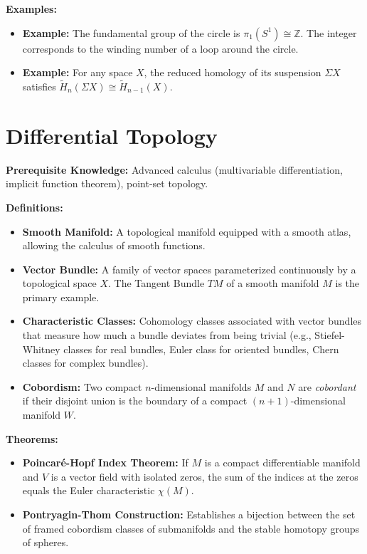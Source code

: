 \textbf{Examples:}
\begin{itemize}
    \item \textbf{Example:} The fundamental group of the circle is $\pi_1(S^1) \cong \mathbb{Z}$. The integer corresponds to the winding number of a loop around the circle.
    \item \textbf{Example:} For any space $X$, the reduced homology of its suspension $\Sigma X$ satisfies $\widetilde{H}_{n}(\Sigma X) \cong \widetilde{H}_{n-1}(X)$.
\end{itemize}

\section{Differential Topology}
\textbf{Prerequisite Knowledge:} Advanced calculus (multivariable differentiation, implicit function theorem), point-set topology.

\textbf{Definitions:}
\begin{itemize}
    \item \textbf{Smooth Manifold:} A topological manifold equipped with a smooth atlas, allowing the calculus of smooth functions.
    \item \textbf{Vector Bundle:} A family of vector spaces parameterized continuously by a topological space $X$. The Tangent Bundle $TM$ of a smooth manifold $M$ is the primary example.
    \item \textbf{Characteristic Classes:} Cohomology classes associated with vector bundles that measure how much a bundle deviates from being trivial (e.g., Stiefel-Whitney classes for real bundles, Euler class for oriented bundles, Chern classes for complex bundles).
    \item \textbf{Cobordism:} Two compact $n$-dimensional manifolds $M$ and $N$ are \textit{cobordant} if their disjoint union is the boundary of a compact $(n+1)$-dimensional manifold $W$.
\end{itemize}

\textbf{Theorems:}
\begin{itemize}
    \item \textbf{Poincar\'e-Hopf Index Theorem:} If $M$ is a compact differentiable manifold and $V$ is a vector field with isolated zeros, the sum of the indices at the zeros equals the Euler characteristic $\chi(M)$.
    \item \textbf{Pontryagin-Thom Construction:} Establishes a bijection between the set of framed cobordism classes of submanifolds and the stable homotopy groups of spheres.
\end{itemize}


